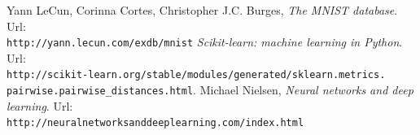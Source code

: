 \documentclass[11pt]{article}
\begin{document}
\vspace*{\fill}
\begin{thebibliography}{x}
Yann LeCun, Corinna Cortes, Christopher J.C. Burges, \textit{The MNIST database}. Url:\\
\verb|http://yann.lecun.com/exdb/mnist|
\textit{Scikit-learn: machine learning in Python}. Url:\\
\verb|http://scikit-learn.org/stable/modules/generated/sklearn.metrics.|\\\verb|pairwise.pairwise_distances.html|.
 Michael Nielsen, \textit{Neural networks and deep learning}. Url:\\
\verb|http://neuralnetworksanddeeplearning.com/index.html|
\end{thebibliography}
\end{document}
